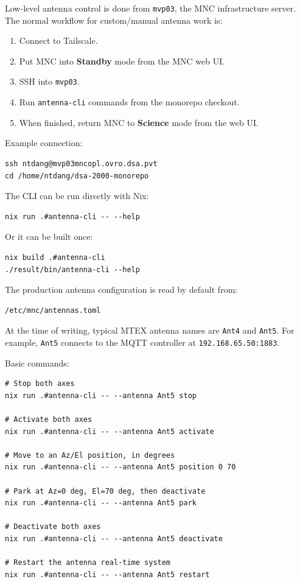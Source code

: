 \documentclass[12pt]{extarticle}
\begin{document}
Low-level antenna control is done from \texttt{mvp03}, the MNC infrastructure
server. The normal workflow for custom/manual antenna work is:

\begin{enumerate}
    \item Connect to Tailscale.
    \item Put MNC into \textbf{Standby} mode from the MNC web UI.
    \item SSH into \texttt{mvp03}.
    \item Run \texttt{antenna-cli} commands from the monorepo checkout.
    \item When finished, return MNC to \textbf{Science} mode from the web UI.
\end{enumerate}

Example connection:

\begin{lstlisting}
ssh ntdang@mvp03mncopl.ovro.dsa.pvt
cd /home/ntdang/dsa-2000-monorepo
\end{lstlisting}

The CLI can be run directly with Nix:

\begin{lstlisting}
nix run .#antenna-cli -- --help
\end{lstlisting}

Or it can be built once:

\begin{lstlisting}
nix build .#antenna-cli
./result/bin/antenna-cli --help
\end{lstlisting}

The production antenna configuration is read by default from:

\begin{lstlisting}
/etc/mnc/antennas.toml
\end{lstlisting}

At the time of writing, typical MTEX antenna names are \texttt{Ant4} and
\texttt{Ant5}. For example, \texttt{Ant5} connects to the MQTT controller at
\texttt{192.168.65.50:1883}.

Basic commands:

\begin{lstlisting}
# Stop both axes
nix run .#antenna-cli -- --antenna Ant5 stop

# Activate both axes
nix run .#antenna-cli -- --antenna Ant5 activate

# Move to an Az/El position, in degrees
nix run .#antenna-cli -- --antenna Ant5 position 0 70

# Park at Az=0 deg, El=70 deg, then deactivate
nix run .#antenna-cli -- --antenna Ant5 park

# Deactivate both axes
nix run .#antenna-cli -- --antenna Ant5 deactivate

# Restart the antenna real-time system
nix run .#antenna-cli -- --antenna Ant5 restart
\end{lstlisting}
\end{document}
